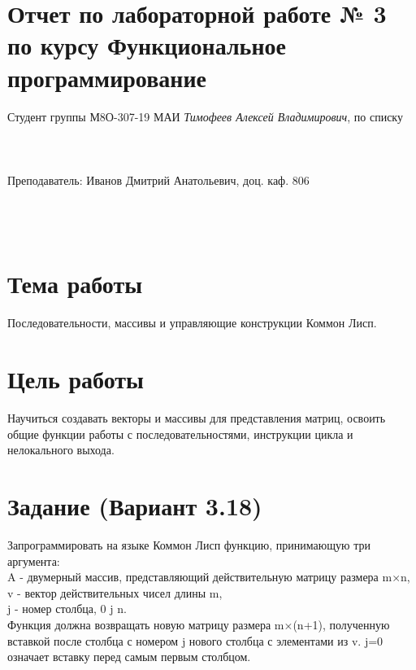 \documentclass[12pt]{article}
\begin{document}
\section*{Отчет по лабораторной работе № 3 \\
по курсу \guillemotleft Функциональное программирование\guillemotright}
\begin{flushright}
Студент группы М8О-307-19 МАИ \textit{Тимофеев Алексей Владимирович},  по списку \\
 \\
 \\
\ \\
Преподаватель: Иванов Дмитрий Анатольевич, доц. каф. 806 \\
 \\
 \\
 \\

\end{flushright}

\section{Тема работы}
Последовательности, массивы и управляющие конструкции Коммон Лисп.

\section{Цель работы}
Научиться создавать векторы и массивы для представления матриц, освоить общие функции работы с последовательностями, инструкции цикла и нелокального выхода.

\section{Задание (Вариант 3.18)}

Запрограммировать на языке Коммон Лисп функцию, принимающую три аргумента:\\
A - двумерный массив, представляющий действительную матрицу размера m×n,\\
v - вектор действительных чисел длины m,\\
j - номер столбца, 0 \leq j \leq n.\\

Функция должна возвращать новую матрицу размера m×(n+1), полученную вставкой после столбца с номером j нового столбца с элементами из v. j=0 означает вставку перед самым первым столбцом.\\
\end{document}
